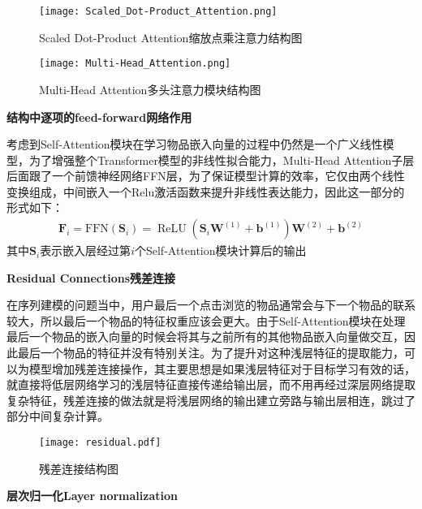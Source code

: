 \begin{figure}[!htb]
   \begin{minipage}{0.48\textwidth}
     \centering
     \texttt{[image: Scaled\_Dot-Product\_Attention.png]} %
     \caption{Scaled Dot-Product Attention缩放点乘注意力结构图}
     \label{Fig:Scaled_Dot-Product_Attention}
   \end{minipage}\hfill
   \begin {minipage}{0.48\textwidth}
     \centering
     \texttt{[image: Multi-Head\_Attention.png]} %
     \caption{Multi-Head Attention多头注意力模块结构图}
     \label{Fig:Multi-Head_Attention}
   \end{minipage}
\end{figure}

\textbf{结构中逐项的feed-forward网络作用}

考虑到Self-Attention模块在学习物品嵌入向量的过程中仍然是一个广义线性模型，为了增强整个Transformer模型的非线性拟合能力，Multi-Head Attention子层后面跟了一个前馈神经网络FFN层，为了保证模型计算的效率，它仅由两个线性变换组成，中间嵌入一个Relu激活函数来提升非线性表达能力，因此这一部分的形式如下：
\begin{align}
	\mathbf{F}_{i}=\mathrm{FFN}\left(\mathbf{S}_{i}\right)=\operatorname{ReLU}\left(\mathbf{S}_{i} \mathbf{W}^{(1)}+\mathbf{b}^{(1)}\right) \mathbf{W}^{(2)}+\mathbf{b}^{(2)}
\end{align}
其中$\mathbf{S}_{i}$表示嵌入层经过第$i$个Self-Attention模块计算后的输出

\textbf{Residual Connections残差连接}

在序列建模的问题当中，用户最后一个点击浏览的物品通常会与下一个物品的联系较大，所以最后一个物品的特征权重应该会更大。由于Self-Attention模块在处理最后一个物品的嵌入向量的时候会将其与之前所有的其他物品嵌入向量做交互，因此最后一个物品的特征并没有特别关注。为了提升对这种浅层特征的提取能力，可以为模型增加残差连接操作，其主要思想是如果浅层特征对于目标学习有效的话，就直接将低层网络学习的浅层特征直接传递给输出层，而不用再经过深层网络提取复杂特征，残差连接的做法就是将浅层网络的输出建立旁路与输出层相连，跳过了部分中间复杂计算。

\begin{figure}
\centering
\texttt{[image: residual.pdf]}
\caption{残差连接结构图}
\label{residual}
\end{figure}

\textbf{层次归一化Layer normalization}


